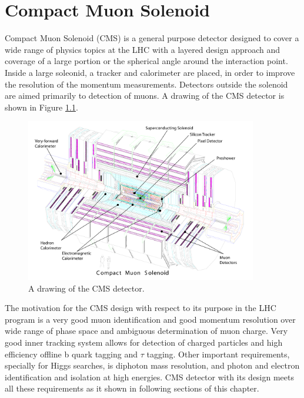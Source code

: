 \chapter{Compact Muon Solenoid} %

\label{Chapter4} %


Compact Muon Solenoid (CMS) is a general purpose detector designed to cover a wide range of physics topics at the LHC with a layered design approach and coverage of a large portion or the spherical angle around the interaction point. Inside a large soleonid, a tracker and calorimeter are placed, in order to improve the resolution of the momentum measurements. Detectors outside the solenoid are aimed primarily to detection of muons. A drawing of the CMS detector is shown in Figure \ref{fig:CMS}. 
\begin{figure}[htbp]
	\centering
		\includegraphics[width=0.9\textwidth]{Figures/CMS.pdf}
	\caption[CMS detector]{A drawing of the CMS detector. \cite{Chatrchyan:2008aa}}
	\label{fig:CMS}
\end{figure}
\par The motivation for the CMS design with respect to its purpose in the LHC program is a very good muon identification and good momentum resolution over wide range of phase space and ambiguous determination of muon charge. Very good inner tracking system allows for detection of charged particles and high efficiency offline b quark tagging and $\tau$ tagging. Other important requirements, specially for Higgs searches, is diphoton mass resolution, and photon and electron identification and isolation at high energies. 
CMS detector with its design meets all these requirements as it shown in following sections of this chapter. 

